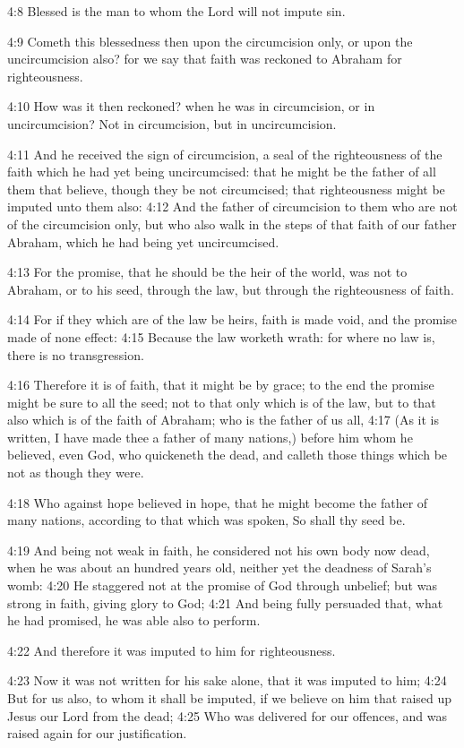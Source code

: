 4:8 Blessed is the man to whom the Lord will not impute sin.

4:9 Cometh this blessedness then upon the circumcision only, or upon
the uncircumcision also? for we say that faith was reckoned to Abraham
for righteousness.

4:10 How was it then reckoned? when he was in circumcision, or in
uncircumcision? Not in circumcision, but in uncircumcision.

4:11 And he received the sign of circumcision, a seal of the
righteousness of the faith which he had yet being uncircumcised: that
he might be the father of all them that believe, though they be not
circumcised; that righteousness might be imputed unto them also: 4:12
And the father of circumcision to them who are not of the circumcision
only, but who also walk in the steps of that faith of our father
Abraham, which he had being yet uncircumcised.

4:13 For the promise, that he should be the heir of the world, was not
to Abraham, or to his seed, through the law, but through the
righteousness of faith.

4:14 For if they which are of the law be heirs, faith is made void,
and the promise made of none effect: 4:15 Because the law worketh
wrath: for where no law is, there is no transgression.

4:16 Therefore it is of faith, that it might be by grace; to the end
the promise might be sure to all the seed; not to that only which is
of the law, but to that also which is of the faith of Abraham; who is
the father of us all, 4:17 (As it is written, I have made thee a
father of many nations,) before him whom he believed, even God, who
quickeneth the dead, and calleth those things which be not as though
they were.

4:18 Who against hope believed in hope, that he might become the
father of many nations, according to that which was spoken, So shall
thy seed be.

4:19 And being not weak in faith, he considered not his own body now
dead, when he was about an hundred years old, neither yet the deadness
of Sarah's womb: 4:20 He staggered not at the promise of God through
unbelief; but was strong in faith, giving glory to God; 4:21 And being
fully persuaded that, what he had promised, he was able also to
perform.

4:22 And therefore it was imputed to him for righteousness.

4:23 Now it was not written for his sake alone, that it was imputed to
him; 4:24 But for us also, to whom it shall be imputed, if we believe
on him that raised up Jesus our Lord from the dead; 4:25 Who was
delivered for our offences, and was raised again for our
justification.

